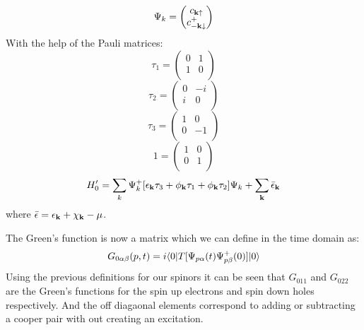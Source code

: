\begin{equation}
\Psi_{k} = 
\begin{pmatrix}
c_{{\bf k}\uparrow} \\
c^{+}_{-{\bf k}\downarrow}
\end{pmatrix}
\end{equation}
%
With the help of the Pauli matrices:
%
\begin{equation}
\tau_{1} =  
\begin{pmatrix}
0 & 1 \\
1 & 0 \\
\end{pmatrix}
\end{equation}
%
\begin{equation}
\tau_{2} =  
\begin{pmatrix}
0 & -i \\
i & 0  \\
\end{pmatrix}
\end{equation}
%
\begin{equation}
\tau_{3} =  
\begin{pmatrix}
1 & 0  \\
0 & -1 \\
\end{pmatrix}
\end{equation}
%
\begin{equation}
1 =  
\begin{pmatrix}
1 & 0 \\
0 & 1 \\
\end{pmatrix}
\end{equation}
%
\begin{equation}
H'_{0} = \sum_{k} \Psi^{+}_{k}[\epsilon_{{\bf k}} \tau_{3} + \phi_{{\bf k}}\tau_{1} + \phi_{{\bf k}}\tau_{2}]\Psi_{k} + \sum_{{\bf k}} \bar{\epsilon}_{{\bf k}}
\end{equation}
%
where $\bar{\epsilon} = \epsilon_{{\bf k}} + \chi_{{\bf k}} - \mu$.

The Green's function is now a matrix which we can define in the time domain as:
%
\begin{equation}
\label{eq:nambugrn}
G_{0\alpha\beta}(p,t) =  i\langle 0 |T[\Psi_{p\alpha}(t)\Psi^{+}_{p\beta}(0) ]|0\rangle 
\end{equation}
%
Using the previous definitions for our spinors it can be seen that $G_{011}$ and $G_{022}$ are the Green's
functions for the spin up electrons and spin down holes respectively. And the off diagaonal elements
correspond to adding or subtracting a cooper pair with out creating an excitation.
%
%

